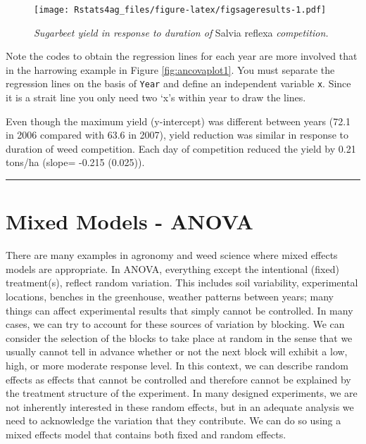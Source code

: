 \documentclass[letterpaper,]{book}
\begin{document}
\begin{figure}
\centering
\texttt{[image: Rstats4ag\_files/figure-latex/figsageresults-1.pdf]}
\caption{\label{fig:figsageresults}\emph{Sugarbeet yield in response to duration of} Salvia reflexa \emph{competition.}}
\end{figure}

Note the codes to obtain the regression lines for each year are more involved that in the harrowing example in Figure \ref{fig:ancovaplot1}. You must separate the regression lines on the basis of \texttt{Year} and define an independent variable \texttt{x}. Since it is a strait line you only need two `x's within year to draw the lines.

Even though the maximum yield (y-intercept) was different between years (72.1 in 2006 compared with 63.6 in 2007), yield reduction was similar in response to duration of weed competition. Each day of competition reduced the yield by 0.21 tons/ha (slope= -0.215 (0.025)).

\begin{center}\rule{0.5\linewidth}{0.5pt}\end{center}

\hypertarget{mixed-models---anova}{%
\chapter{Mixed Models - ANOVA}\label{mixed-models---anova}}

There are many examples in agronomy and weed science where mixed effects models are appropriate. In ANOVA, everything except the intentional (fixed) treatment(s), reflect random variation. This includes soil variability, experimental locations, benches in the greenhouse, weather patterns between years; many things can affect experimental results that simply cannot be controlled. In many cases, we can try to account for these sources of variation by blocking. We can consider the selection of the blocks to take place at random in the sense that we usually cannot tell in advance whether or not the next block will exhibit a low, high, or more moderate response level. In this context, we can describe random effects as effects that cannot be controlled and therefore cannot be explained by the treatment structure of the experiment. In many designed experiments, we are not inherently interested in these random effects, but in an adequate analysis we need to acknowledge the variation that they contribute. We can do so using a mixed effects model that contains both fixed and random effects.
\end{document}
